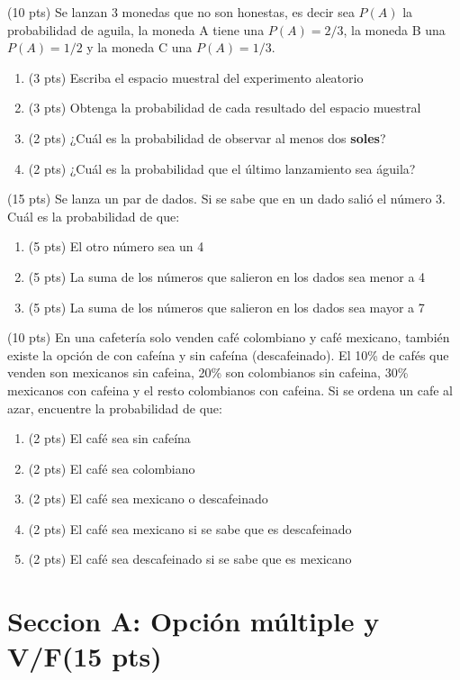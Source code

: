 \documentclass[addpoints]{exam}
\theoremstyle{mytheor}
\begin{document}
\begin{questions}
  \question (10 pts) Se lanzan 3 monedas que no son honestas, es decir sea $P(A)$ la probabilidad de aguila, la moneda A tiene una $P(A) = 2/3$, la moneda B una $P(A) = 1/2$ y la moneda C una $P(A) = 1/3$.
  
  \begin{enumerate}[label=\Alph*)]
  \item (3 pts) Escriba el espacio muestral del experimento aleatorio
  \item (3 pts) Obtenga la probabilidad de cada resultado del espacio muestral
  \item (2 pts) ¿Cuál es la probabilidad de observar al menos dos \textbf{soles}?
  \item (2 pts) ¿Cuál es la probabilidad que el último lanzamiento sea águila?
  \end{enumerate}
  
\question (15 pts) Se lanza un par de dados. Si se sabe que en un dado salió el número 3. Cuál es la probabilidad de que:
\begin{enumerate}[label=\Alph*)]
\item (5 pts) El otro número sea un 4
\item (5 pts) La suma de los números que salieron en los dados sea menor a 4
\item (5 pts) La suma de los números que salieron en los dados sea mayor a 7
\end{enumerate}

\question (10 pts) En una cafetería solo venden café colombiano y café mexicano, también existe la opción de con cafeína y sin cafeína (descafeinado). El 10\% de cafés que venden son mexicanos sin cafeina, 20\% son colombianos sin cafeina, 30\% mexicanos con cafeina y el resto colombianos con cafeina. Si se ordena un cafe al azar, encuentre la probabilidad de que:
\begin{enumerate}[label=\Alph*)]
\item (2 pts) El café sea sin cafeína
\item (2 pts) El café sea colombiano
\item (2 pts) El café sea mexicano o descafeinado
\item (2 pts) El café sea mexicano si se sabe que es descafeinado
\item (2 pts) El café sea descafeinado si se sabe que es mexicano

\end{enumerate}
\end{questions}


  \section*{Seccion A: Opción múltiple y V/F(15 pts)}
  
\end{document}
